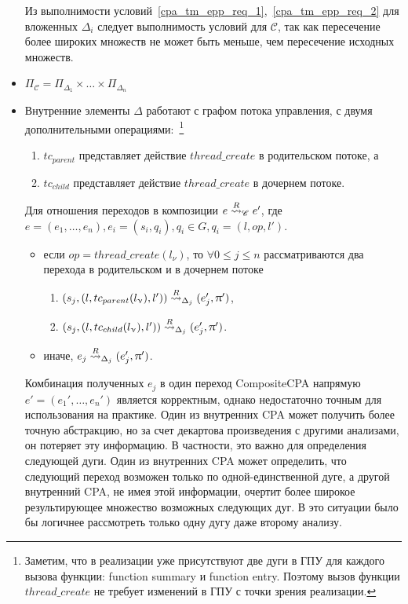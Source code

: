 \begin{itemize}
Из выполнимости условий~\ref{cpa_tm_epp_req_1},~\ref{cpa_tm_epp_req_2} для вложенных $\Delta_i$ следует выполнимость условий для $\mathscr{C}$, так как пересечение более широких множеств не может быть меньше, чем пересечение исходных множеств.

\item  $\Pi_{\mathscr{C}} = \Pi_{\Delta_1} \times \dots \times \Pi_{\Delta_n}$

\item 
Внутренние элементы $\Delta$ работают с графом потока управления, с двумя дополнительными операциями:~\footnote{Заметим, что в реализации \cpachecker уже присутствуют две дуги в ГПУ для каждого вызова функции: function summary и function entry. Поэтому вызов функции $thread\_create$ не требует изменений в ГПУ с точки зрения реализации.}
\begin{enumerate}
\item $tc_{parent}$ представляет действие $thread\_create$ в родительском потоке, а
\item $tc_{child}$ представляет действие $thread\_create$ в дочернем потоке.
\end{enumerate}

Для отношения переходов в композиции
$e \stackrel{R}{\leadsto}_{\mathscr{C}} e'$, где $e = (e_1, \dots, e_n), e_i = (s_i, q_i), q_i \in G, q_i=(l,op,l')$.

\begin{itemize}
\item если $op=thread\_create(l_\nu)$, то $\forall 0 \le j \le n$ рассматриваются два перехода в родительском и в дочернем потоке
\begin{enumerate}
\item $(s_j, (l, tc_{parent}(l_\upnu), l')) \stackrel{R}{\leadsto}_{\Delta_j} (e_j',\uppi')$,
\item $(s_j, (l, tc_{child}(l_\upnu), l')) \stackrel{R}{\leadsto}_{\Delta_j} (e_j',\uppi')$.
\end{enumerate}
\item иначе, $e_j \stackrel{R}{\leadsto}_{\Delta_j} (e_j',\uppi')$.
\end{itemize}

Комбинация полученных $e_j$ в один переход CompositeCPA напрямую $e' = (e_1', \dots, e_n')$ является корректным, однако недостаточно точным для использования на практике. 
Один из внутренних CPA может получить более точную абстракцию, но за счет декартова произведения с другими анализами, он потеряет эту информацию. 
В частности, это важно для определения следующей дуги. Один из внутренних CPA может определить, что следующий переход возможен только по одной-единственной дуге, а другой внутренний CPA, не имея этой информации, очертит более широкое результирующее множество возможных следующих дуг.
В это ситуации было бы логичнее рассмотреть только одну дугу даже второму анализу.


\end{itemize}
